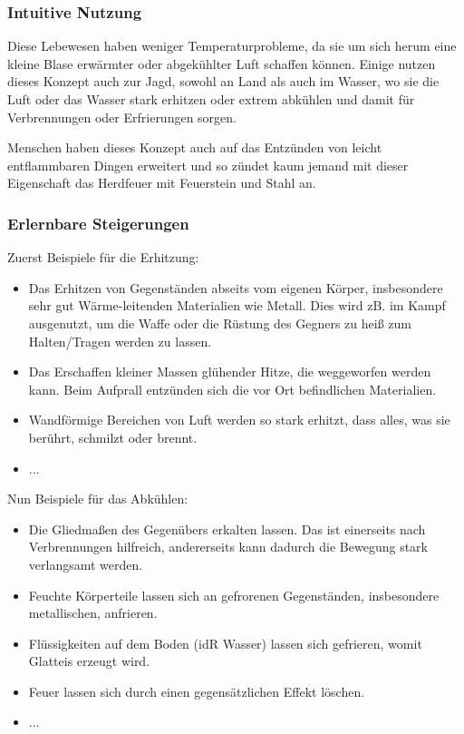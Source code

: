 \subsubsection{Intuitive Nutzung}
Diese Lebewesen haben weniger Temperaturprobleme, da sie um sich herum eine kleine Blase erwärmter oder abgekühlter Luft schaffen können. Einige nutzen dieses Konzept auch zur Jagd, sowohl an Land als auch im Wasser, wo sie die Luft oder das Wasser stark erhitzen oder extrem abkühlen und damit für Verbrennungen oder Erfrierungen sorgen.

Menschen haben dieses Konzept auch auf das Entzünden von leicht entflammbaren Dingen erweitert und so zündet kaum jemand mit dieser Eigenschaft das Herdfeuer mit Feuerstein und Stahl an.

\subsubsection{Erlernbare Steigerungen}
Zuerst Beispiele für die Erhitzung:
\begin{itemize}
	\item Das Erhitzen von Gegenständen abseits vom eigenen Körper, insbesondere sehr gut Wärme-leitenden Materialien wie Metall. Dies wird zB. im Kampf ausgenutzt, um die Waffe oder die Rüstung des Gegners zu heiß zum Halten/Tragen werden zu lassen.
	\item Das Erschaffen kleiner Massen glühender Hitze, die weggeworfen werden kann. Beim Aufprall entzünden sich die vor Ort befindlichen Materialien. 
	\item Wandförmige Bereichen von Luft werden so stark erhitzt, dass alles, was sie berührt, schmilzt oder brennt.
	\item ...
\end{itemize}

Nun Beispiele für das Abkühlen:
\begin{itemize}
	\item Die Gliedmaßen des Gegenübers erkalten lassen. Das ist einerseits nach Verbrennungen hilfreich, andererseits kann dadurch die Bewegung stark verlangsamt werden.
	\item Feuchte Körperteile lassen sich an gefrorenen Gegenständen, insbesondere metallischen, anfrieren.
	\item Flüssigkeiten auf dem Boden (idR Wasser) lassen sich gefrieren, womit Glatteis erzeugt wird.
	\item Feuer lassen sich durch einen gegensätzlichen Effekt löschen.
	\item ...
\end{itemize}

